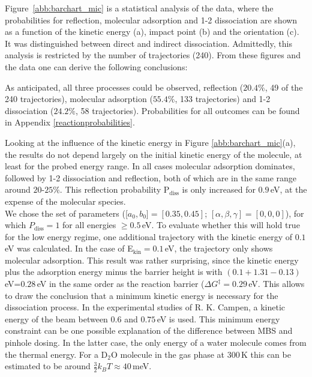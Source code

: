 \documentclass[11pt,DIV=13,BCOR=5mm,a4paper,headinclude]{scrbook}
\begin{document}
Figure~\ref{abb:barchart_mic} is a statistical analysis of the data, where the probabilities for reflection, molecular adsorption and 1-2 dissociation are shown as a function of the kinetic energy (a), impact point (b) and the orientation (c).
It was distinguished between direct and indirect dissociation.
Admittedly, this analysis is restricted by the number of trajectories (240).
From these figures and the data one can derive the following conclusions:


As anticipated, all three processes could be observed, reflection ($20.4\%$, 49 of the 240 trajectories), molecular adsorption ($55.4\%$, 133 trajectories) and 1-2 dissociation ($24.2\%$, 58 trajectories).
Probabilities for all outcomes can be found in Appendix \ref{reactionprobabilities}.


Looking at the influence of the kinetic energy in Figure \ref{abb:barchart_mic}(a), the results do not depend largely on the initial kinetic energy of the molecule, at least for the probed energy range.
In all cases molecular adsorption dominates, followed by 1-2 dissociation and reflection, both of which are in the same range around $20$-$25\%$.
This reflection probability P$_\textrm{diss}$ is only increased for $0.9\,$eV, at the expense of the molecular species.\\
We chose the set of parameters ([$a_0,b_0]=[0.35,0.45]$; $[\alpha,\beta,\gamma]=[0,0,0]$), for which $P_\textrm{diss}=1$ for all energies $\geq 0.5\,$eV.
To evaluate whether this will hold true for the low energy regime, one additional trajectory with the kinetic energy of $0.1\,$eV was calculated.
In the case of E$_\textrm{kin}=0.1\,$eV, the trajectory only shows molecular adsorption.
This result was rather surprising, since the kinetic energy plus the adsorption energy minus the barrier height is with $(0.1+1.31-0.13)\,$eV=$0.28\,$eV in the same order as the reaction barrier ($\Delta G^\ddagger=0.29\,$eV\cite{WirthJPCC2012}. %
This allows to draw the conclusion that a minimum kinetic energy is necessary for the dissociation process.
In the experimental studies of R. K. Campen\cite{Heiden11-20_2018}, a kinetic energy of the beam between $0.6$ and $0.75\,$eV is used.
This minimum energy constraint can be one possible explanation of the difference between MBS and pinhole dosing.
In the latter case, the only energy of a water molecule comes from the thermal energy.
For a D$_2$O molecule in the gas phase at $300\,$K this can be estimated to be around $\frac{3}{2}k_BT\approx40\,$meV.
\end{document}
